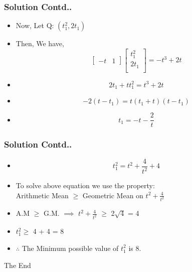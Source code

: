 \documentclass[12pt]{beamer}
\begin{document}

\begin{frame}
\frametitle{Solution Contd..}
\begin{itemize}
\item Now, Let Q: $( t_1^2, 2t_1 )$
\item Then, We have,
\[
\begin{bmatrix}
    -t & 1  
\end{bmatrix}
\begin{bmatrix}
    t_1^2\\
    2t_1\\  
\end{bmatrix} = 
-t^3 + 2t
\]
\item \[
2t_1 + tt_1^2 = t^3 + 2t 
\]
\item 
\[
-2(t - t_1) = t(t_1 + t)(t - t_1)
\]
\item
\[
t_1 = -t - \frac{2}{t}
\]
\end{itemize}
\end{frame}



\begin{frame}
\frametitle{Solution Contd..}
\begin{itemize}
\item
\[
t_1^2 = t^2 + \frac{4}{t^2} + 4
\]
\item To solve above equation we use the property:\\
Arithmetic Mean $\geq$ Geometric Mean on $t^2 + \frac{4}{t^2}$
\item A.M $\geq$ G.M. $\implies$ $t^2 + \frac{4}{t^2}$ $\geq$ 2$\sqrt{4}$ = 4
\item $t_1^2 \geq$ 4 + 4 = 8
\item $\therefore$ The Minimum possible value of $t_1^2$ is 8.
\end{itemize}
\end{frame}


\begin{frame}
\Huge{\centerline{The End}}
\end{frame}

\end{document}
